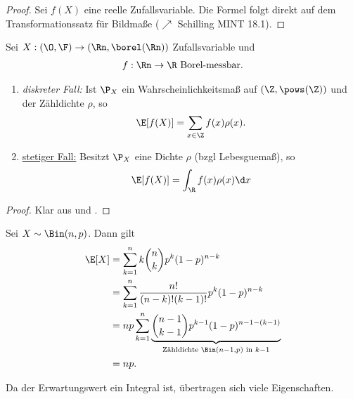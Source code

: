 \begin{proof}
	Sei $f(X)$ eine reelle Zufallsvariable. Die Formel folgt direkt auf dem Transformationssatz für Bildmaße ($\nearrow$ Schilling MINT 18.1).
\end{proof}
\begin{proposition}
	Sei $X: (\O, \F) \to (\Rn, \borel(\Rn))$ Zufallsvariable und
	\begin{align*}
		f: \Rn \to \R \text{ Borel-messbar}.
	\end{align*}
	\begin{enumerate}
		\item \emph{diskreter Fall:} Ist $\P_X$ ein Wahrscheinlichkeitsmaß auf $(\Z, \pows(\Z))$ und der Zähldichte $\rho$, so
		\begin{align*}
			\E[f(X)] = \sum_{x \in \Z} f(x)\rho(x).
		\end{align*}
		\item \ul{stetiger Fall:} Besitzt $\P_X$ eine Dichte $\rho$ (bzgl Lebesguemaß), so
		\begin{align*}
			\E[f(X)] = \int_{\R} f(x)\rho(x) \d x
		\end{align*}
	\end{enumerate}
\end{proposition}
\begin{proof}
	Klar aus  und . %
\end{proof}
\begin{example}
	Sei $X \sim \Bin(n,p)$. Dann gilt
	\begin{align*}
		\E[X] &= \sum_{k=1}^n k\binom{n}{k}p^k (1-p)^{n-k}\\
		&= \sum_{k=1}^n \frac{n!}{(n-k)!(k-1)!}p^k (1-p)^{n-k}\\
		&= np \sum_{k=1}^n \underbrace{\binom{n-1}{k-1}p^{k-1}(1-p)^{n-1-(k-1)}}_{\text{Zähldichte }\Bin(n-1,p) \text{ in } k-1}\\
		&= np.
	\end{align*}
\end{example}
Da der Erwartungswert ein Integral ist, übertragen sich viele Eigenschaften. 
